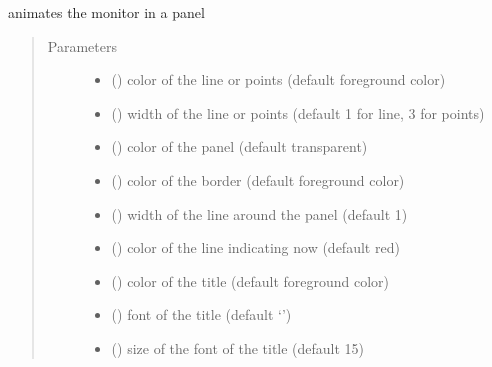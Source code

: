 \documentclass[letterpaper,10pt,english]{sphinxmanual}
\begin{document}
\begin{fulllineitems}
\begin{quote}
\begin{description}
\end{description}\end{quote}

\begin{fulllineitems}
\label{\detokenize{Reference:salabim.Monitor.animate}}
animates the monitor in a panel
\begin{quote}\begin{description}
\item[{Parameters}] \leavevmode\begin{itemize}
\item {} 
 () \textendash{} color of the line or points (default foreground color)

\item {} 
 () \textendash{} width of the line or points (default 1 for line, 3 for points)

\item {} 
 () \textendash{} color of the panel (default transparent)

\item {} 
 () \textendash{} color of the border (default foreground color)

\item {} 
 () \textendash{} width of the line around the panel (default 1)

\item {} 
 () \textendash{} color of the line indicating now (default red)

\item {} 
 () \textendash{} color of the title (default foreground color)

\item {} 
 ({\hyperref[\detokenize{Reference:salabim.Animate.font}]{}}) \textendash{} font of the title (default ‘’)

\item {} 
 () \textendash{} size of the font of the title (default 15)


\end{itemize}
\end{description}
\end{quote}
\end{fulllineitems}
\end{fulllineitems}
\end{document}
